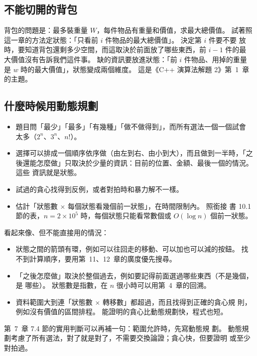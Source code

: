 \subsection{不能切開的背包}

背包的問題是：最多裝重量 $W$，每件物品有重量和價值，求最大總價值。 試著照
這一章的方法定狀態：「只看前 $i$ 件物品的最大總價值」。 決定第 $i$ 件要不要
放時，要知道背包還剩多少空間，而這取決於前面放了哪些東西，前 $i - 1$ 件的最
大價值沒有告訴我們這件事。 缺的資訊要放進狀態：「前 $i$ 件物品、用掉的重量
是 $w$ 時的最大價值」，狀態變成兩個維度。 這是《C++ 演算法解題 2》第~1~章的主題。

\subsection{什麼時候用動態規劃}

\begin{itemize}
\item 題目問「最少」「最多」「有幾種」「做不做得到」，而所有選法一個一個試會
太多（$2^n$、$3^n$、$n!$）。
\item 選擇可以排成一個順序依序做（由左到右、由小到大），而且做到一半時，「之
後還能怎麼做」只取決於少量的資訊：目前的位置、金額、最後一個的情況。 這些
資訊就是狀態。
\item 試過的貪心找得到反例，或者對拍時和暴力解不一樣。
\item 估計「狀態數 $\times$ 每個狀態看幾個前一狀態」，在時間限制內。 照銜接
書 10.1 節的表，$n = 2 \times 10^5$ 時，每個狀態只能看常數個或
$O(\log n)$ 個前一狀態。
\end{itemize}

看起來像、但不能直接用的情況：

\begin{itemize}
\item 狀態之間的箭頭有環，例如可以往回走的移動、可以加也可以減的按鈕。 找
不到計算順序，要用第~11、12~章的廣度優先搜尋。
\item 「之後怎麼做」取決於整個過去，例如要記得前面選過哪些東西（不是幾個，是
哪些）。 狀態數是指數，在 $n$ 很小時可以用第~4~章的回溯。
\item 資料範圍大到連「狀態數 $\times$ 轉移數」都超過，而且找得到正確的貪心規
則，例如沒有價值的區間排程。 能證明的貪心比動態規劃快，程式也短。
\end{itemize}

第~7~章 7.4 節的實用判斷可以再補一句：範圍允許時，先寫動態規
劃。 動態規劃考慮了所有選法，對了就是對了，不需要交換論證；貪心快，但要證明
或至少對拍過。

